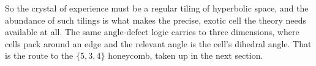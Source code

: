 So the crystal of experience must be a regular tiling of hyperbolic space, and the abundance of such tilings
is what makes the precise, exotic cell the theory needs available at all. The same angle-defect logic
carries to three dimensions, where cells pack around an edge and the relevant angle is the cell's dihedral
angle. That is the route to the $\{5,3,4\}$ honeycomb, taken up in the next section.
